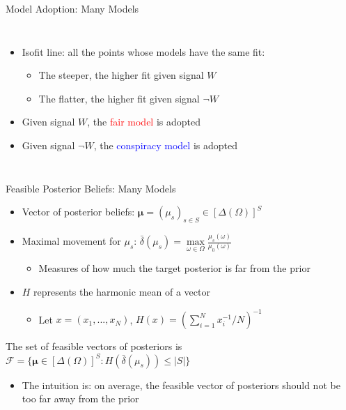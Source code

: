 \documentclass[aspectratio=169]{beamer}
\theoremstyle{definition}
\theoremstyle{plain}
\theoremstyle{plain}
\theoremstyle{definition}
\theoremstyle{plain}
\theoremstyle{plain}
\theoremstyle{plain}
\theoremstyle{plain}
\theoremstyle{remark}
\theoremstyle{definition}
\begin{document}
\begin{frame}{Model Adoption: Many Models}
\begin{columns}[c]
	\begin{itemize}
            \item<2-> Isofit line: all the points whose models have the same fit:
            \begin{itemize}
                \item The steeper, the higher fit given signal \( W \)
                \item The flatter, the higher fit given signal \( \lnot W \)
            \end{itemize}
            \smallskip
            \item<3-> Given signal \( W \), the \textcolor{red}{fair model} is adopted
            \item<3-> Given signal \( \lnot{W} \), the \textcolor{blue}{conspiracy model} is adopted
        \end{itemize}
\end{columns}
\end{frame}

\begin{frame}[label=PB4]{Feasible Posterior Beliefs: Many Models}

\begin{itemize}
    \item Vector of posterior beliefs: \( \bm{\mu} = (\mu_s)_{s \in S} \in [\Delta(\Omega)]^S \)
    \smallskip
    \item Maximal movement for \( \mu_s \): \( \bar{\delta}(\mu_s) = \max\limits_{\omega \in \Omega} \frac{\mu_s(\omega)}{\mu_0(\omega)} \)
    \begin{itemize}
        \item Measures of how much the target posterior is far from the prior
    \end{itemize}
    \smallskip
    \item \( H \) represents the harmonic mean of a vector
    \begin{itemize}
        \item Let \( x = (x_1,...,x_N) \), \( H(x) = (\sum_{i=1}^N x_i^{-1}/N )^{-1} \)
    \end{itemize}
    \medskip
\end{itemize}

\begin{theorem}
    The set of feasible vectors of posteriors is \( \mathcal{F} = \Big\{ \bm{\mu} \in [\Delta(\Omega)]^S: H(\bar{\delta}(\mu_s)) \leq |S| \Big\} \)
\end{theorem}

\begin{itemize}
    \item The intuition is: on average, the feasible vector of posteriors should not be too far away from the prior
\end{itemize}

\end{frame}
\end{document}
